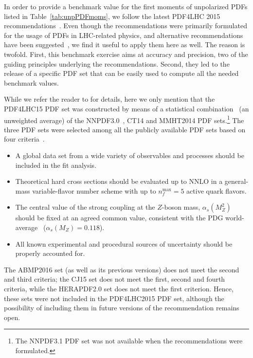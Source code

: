 In order to provide a benchmark value for the first moments of unpolarized PDFs
listed in Table~\ref{tab:unpPDFmoms}, we follow the latest PDF4LHC 2015 
recommendations~\cite{Butterworth:2015oua}.
%
Even though the recommendations were primarily formulated for the usage of PDFs
in LHC-related physics, and alternative recommendations have been 
suggested~\cite{Accardi:2016ndt}, we find it useful to apply them here as well.
%
The reason is twofold.
%
First, this benchmark exercise aims at accuracy and precision,  
two of the guiding principles underlying the recommendations.
%
Second, they led to the release of a specific PDF set
that can be easily used to compute all the needed benchmark values.

While we refer the reader to \cite{Butterworth:2015oua} for details,
here we only mention that the PDF4LHC15 PDF set was constructed by means of
a statistical combination~\cite{Carrazza:2015hva,Gao:2013bia,Watt:2012tq,
Carrazza:2015aoa} (an unweighted average) of the 
NNPDF3.0~\cite{Ball:2014uwa}, CT14 and MMHT2014 PDF sets.\footnote{The 
NNPDF3.1 PDF set was not available when the recommendations were formulated.}
%
The three PDF sets were selected among all the publicly available PDF sets
based on four criteria~\cite{Butterworth:2015oua}.
%
\begin{itemize}
%
\item A global data set from a wide variety of observables and processes
should be included in the fit analysis.
%
\item Theoretical hard cross sections should be evaluated up to NNLO in a
general-mass variable-flavor number scheme with up to $n_f^\text{max}=5$ 
active quark flavors.
%
\item The central value of the strong coupling at the $Z$-boson mass,
$\alpha_s(M_Z^2)$ should be fixed at an agreed common value, consistent 
with the PDG world-average~\cite{Olive:2016xmw} ($\alpha_s(M_Z)=0.118$).
%
\item All known experimental and procedural sources of uncertainty should be 
properly accounted for.
%
\end{itemize}
%
The ABMP2016 set (as well as its previous versions) does not meet the second 
and third criteria; the CJ15 set does not meet the first, second and fourth
criteria, while the HERAPDF2.0 set does not meet the first criterion.
%
Hence, these sets were not included in the PDF4LHC2015 PDF set, although the 
possibility of including them in future versions of the recommendation 
remains open.

